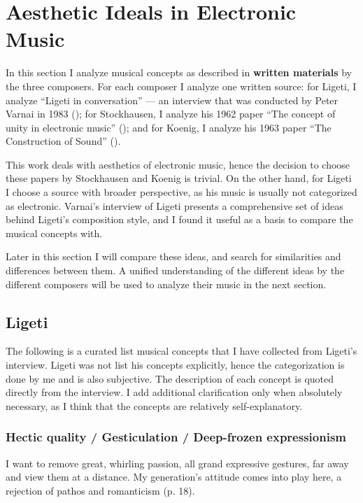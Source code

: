 \documentclass[a4paper,11pt]{article}
\newenvironment{MyShadequote}[1][]{%
    \ignorespaces%
    \begin{mdframed}[style=MyShadeQuoteStyle,#1]%
}{%
    \end{mdframed}%
    \ignorespacesafterend%
}%
\begin{document}
\section{Aesthetic Ideals in Electronic Music}
\label{sec:aesthetic_ideals_in_electronic_music}

In this section I analyze musical concepts as described in \textbf{written materials} by the three composers.
For each composer I analyze one written source:
for Ligeti, I analyze ``Ligeti in conversation'' --- an interview that was conducted by Peter Varnai in 1983 (\cite{varnai});
for Stockhausen, I analyze his 1962 paper ``The concept of unity in electronic music'' (\cite{stockhausen});
and for Koenig, I analyze his 1963 paper ``The Construction of Sound'' (\cite{koenig}).

This work deals with aesthetics of electronic music, hence the decision to choose these papers by Stockhausen and Koenig is trivial.
On the other hand, for Ligeti I choose a source with broader perspective, as his music is usually not categorized as electronic.
Varnai's interview of Ligeti presents a comprehensive set of ideas behind Ligeti's composition style, and I found it useful as a basis to compare the musical concepts with.

Later in this section I will compare these ideas, and search for similarities and differences between them.
A unified understanding of the different ideas by the different composers will be used to analyze their music in the next section.

\subsection{Ligeti}
\label{sub:eshtetic_ligeti}

The following is a curated list musical concepts that I have collected from Ligeti's interview.
Ligeti was not list his concepts explicitly, hence the categorization is done by me and is also subjective.
The description of each concept is quoted directly from the interview.
I add additional clarification only when absolutely necessary, as I think that the concepts are relatively self-explanatory.

\subsubsection{Hectic quality / Gesticulation / Deep-frozen expressionism}
\label{subs:ligeti:hectic}

\begin{MyShadequote}
  I want to remove great, whirling passion, all grand expressive gestures, far away and view them at a distance.
  My generation's attitude comes into play here, a rejection of pathos and romanticism (p. 18).
\end{MyShadequote}
\end{document}
